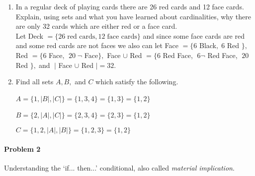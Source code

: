 \documentclass[11pt, a4paper]{article}
\newcommand\setItemNumber[1]{\setcounter{enumi}{\numexpr#1-1\relax}}
\begin{document}
\begin{enumerate}
    \setItemNumber{26}
    \item In a regular deck of playing cards there are 26 red cards and 12 face cards. Explain, using sets and what you have learned about cardinalities, why there are only 32 cards which are either red or a face card.\\

        Let Deck $= \{ 26\;\text{red cards},12\;\text{face cards}\}$ and since some face cards are red and some red cards are not faces we also can let Face $= \{6$ Black$,\;6$ Red $\},$ Red $=\{6$ Face, $\;20\;\neg$ Face$\},$ Face $\cup$ Red $=\{6$ Red Face, $\;6\neg$ Red Face, $\;20$ Red $\},\;$and  $\;|$ Face $\cup$ Red $| = 32$.

    \setItemNumber{30}
    \item Find all sets $A,B,$ and $C$ which satisfy the following.\
       
        \centering $A=\{1,|B|,|C|\} = \{1,3,4\} = \{1,3\} = \{1,2\}$\

        \centering $B=\{2,|A|,|C|\} = \{2,3,4\} = \{2,3\} = \{1,2\}$\

        \centering $C=\{1,2,|A|,|B|\} = \{1,2,3\} = \{1,2\}$


\end{enumerate}

\paragraph{Problem 2} Understanding the ‘if... then...’ conditional, also called {\it material implication}.

\end{document}
